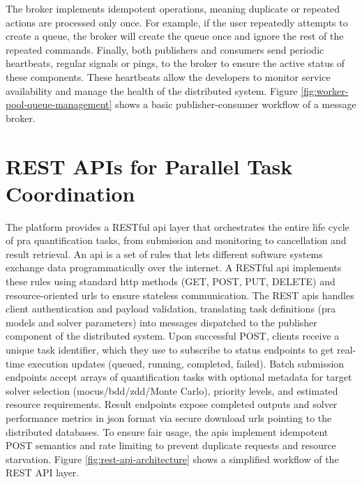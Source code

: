{The broker implements idempotent operations, meaning duplicate or repeated actions are processed only once. For example, if the user repeatedly attempts to create a queue, the broker will create the queue once and ignore the rest of the repeated commands. Finally, both publishers and consumers send periodic heartbeats, regular signals or pings, to the broker to ensure the active status of these components. These heartbeats allow the developers to monitor service availability and manage the health of the distributed system. Figure \ref{fig:worker-pool-queue-management} shows a basic publisher-consumer workflow of a message broker.



\section{REST APIs for Parallel Task Coordination}

The platform provides a RESTful \acrshort{api} layer that orchestrates the entire life cycle of \acrshort{pra} quantification tasks, from submission and monitoring to cancellation and result retrieval. An \acrshort{api} is a set of rules that lets different software systems exchange data programmatically over the internet. A RESTful \acrshort{api} implements these rules using standard \acrshort{http} methods (GET, POST, PUT, DELETE) and resource-oriented \acrshort{url}s to ensure stateless communication. The REST \acrshort{api}s handles client authentication and payload validation, translating task definitions (\acrshort{pra} models and solver parameters) into messages dispatched to the publisher component of the distributed system. Upon successful POST, clients receive a unique task identifier, which they use to subscribe to status endpoints to get real-time execution updates (queued, running, completed, failed). Batch submission endpoints accept arrays of quantification tasks with optional metadata for target solver selection (\acrshort{mocus}/\acrshort{bdd}/\acrshort{zdd}/Monte Carlo), priority levels, and estimated resource requirements. Result endpoints expose completed outputs and solver performance metrics in \acrshort{json} format via secure download \acrshort{url}s pointing to the distributed databases. To ensure fair usage, the \acrshort{api}s implement idempotent POST semantics and rate limiting to prevent duplicate requests and resource starvation. Figure \ref{fig:rest-api-architecture} shows a simplified workflow of the REST API layer.

}
